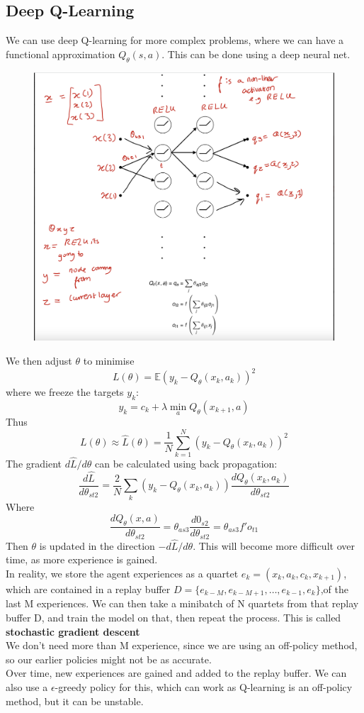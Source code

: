 \documentclass{article}
\begin{document}
\subsection{Deep Q-Learning}
We can use deep Q-learning for more complex problems, where we can have a functional approximation $Q_\theta (s,a)$. This can be done using a deep neural net.
\begin{figure}[H]
    \centering
    \includegraphics[width=0.7\linewidth]{Screenshot 2023-03-13 at 11.31.27.png}
\end{figure}
We then adjust $\theta$ to minimise
\[
L(\theta) = \mathbb E(y_k - Q_\theta(x_k,a_k))^2
\]
where we freeze the targets $y_k$:
\[
y_k = c_k + \lambda \min_a Q_\theta(x_{k+1},a)
\]
Thus
\[
L(\theta) \approx \hat L(\theta) = \frac{1}{N} \sum_{k=1}^N(y_k - Q_\theta(x_k,a_k))^2
\]
The gradient $d \hat L/d\theta$ can be calculated using back propagation:
\[
\frac{d \hat L}{d \theta_{st2}} = \frac{2}{N} \sum_k(y_k - Q_\theta(x_k,a_k)) \frac{d Q_\theta(x_k,a_k)}{d \theta_{st2}}
\]
Where 
\[
\frac{d Q_\theta(x,a)}{d \theta_{st2}} = \theta_{as3} \frac{d0_{s2}}{d \theta_{st2}} = \theta_{as3}f'o_{t1}
\]
Then $\theta$ is updated in the direction $-d \hat L/d \theta$. This will become more difficult over time, as more experience is gained. \\
In reality, we store the agent experiences as a quartet $e_k = (x_k,a_k,c_k,x_{k+1})$, which are contained in a replay buffer $D = \{e_{k-M},e_{k-M+1},\hdots,e_{k-1},e_k\}$,of the last M experiences. We can then take a minibatch of N quartets from that replay buffer D, and train the model on that, then repeat the process. This is called \textbf{stochastic gradient descent}\\
We don't need more than M experience, since we are using an off-policy method, so our earlier policies might not be as accurate.  \\
Over time, new experiences are gained and added to the replay buffer. We can also use a $\epsilon$-greedy policy for this, which can work as Q-learning is an off-policy method, but it can be unstable.
\end{document}
